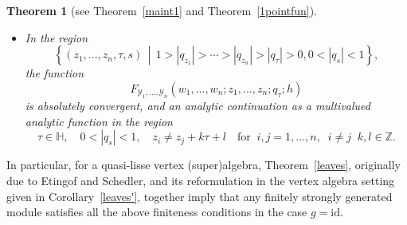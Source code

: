 \documentclass[9pt]{amsart}
\newtheorem{theorem}{Theorem}[section]
\newcommand{\al}{\alpha}
\begin{document}
\begin{theorem}[see Theorem~\ref{maint1} and Theorem~\ref{1pointfun}]
\begin{itemize}
\begin{align}\label{diffequ1}
\begin{split}
    & \prod_{k=1}^m 
    \mathcal{O}_i^h\left( \sum_{j=1}^n \operatorname{wt} w_j + 2(m - k) \right) f \\
    & \quad + \sum_{p=1}^m 
    b_{p,i}(z_1, \dots, z_n; q; h)\,
    \prod_{k=1}^{m-p} 
    \mathcal{O}_i^h\left( \sum_{j=1}^n \operatorname{wt} w_j + 2(m - p - k) \right) f \\
    & = 0.
\end{split}
\end{align}
\begin{align}\label{98}
\begin{split}
    \left(q_s \frac{\partial}{\partial q_s} \right)^m f
    + \sum_{p=1}^m c_{p,i}(z_1, \dots, z_n; q; h)
    \left( q_s \frac{\partial}{\partial q_s} \right)^{m-p} f = 0,
\end{split}
\end{align}
$i=1,...,n,$ in the regions $1>|q_{z_{1}}|>\cdots>|q_{z_{n}}|>|q|>0,0<|q_s|<1$
where for any $\al\in \mathbb{C}$
\begin{align*}
& \mathcal{O}_{j}^{h}(\alpha) = (2\pi i)^{2} q \frac{\partial}{\partial q} 
+ \tilde{G}_{2}(q) \alpha 
+ \tilde{G}_{2}(q) \sum_{i=1}^{n} z_{i} \frac{\partial}{\partial z_{i}} \\
&\quad - \sum_{i \neq j} \sum_{k=0}^{N-1} 
\tilde{\wp}_{1}(z_{i} - z_{j}; q) \frac{\partial}{\partial z_{i}}, 
\quad \text{for } j = 1, \dots, n, \\
& \prod_{j=1}^{m} \mathcal{O}^{h}(\alpha_{j}) 
= \mathcal{O}^{h}(\alpha_{1}) \cdots \mathcal{O}^{h}(\alpha_{m}).
\end{align*}

\item In the region 
\[\left\{(z_{1},...,z_{n},\tau,s)\,\middle|\, 1>|q_{z_{1}}|>\cdots>|q_{z_{n}}|>|q_{\tau}|>0, 0<|q_s|<1\right\},\] the function \[F_{\mathcal{Y}_{1},...,\mathcal{Y}_{n}}(w_{1},...,w_{n};z_{1},...,z_{n};q_\tau;h)\]
is absolutely convergent, and an analytic continuation as a multivalued analytic function in the region 
\[\tau\in \mathbb{H},\quad 0<|q_s|<1,\quad  z_{i}\neq z_{j}+k\tau+l\quad \text{for}\;\; i,j=1,...,n, \;\; i\neq j\;\; k,l\in\mathbb{Z}.\]
\end{itemize}
\end{theorem}
In particular, for a quasi-lisse vertex (super)algebra, Theorem~\ref{leaves}, originally due to Etingof and Schedler, and its reformulation in the vertex algebra setting given in Corollary~\ref{leaves'}, together imply that any finitely strongly generated module satisfies all the above finiteness conditions in the case $g = \mathrm{id}$.
\end{document}
